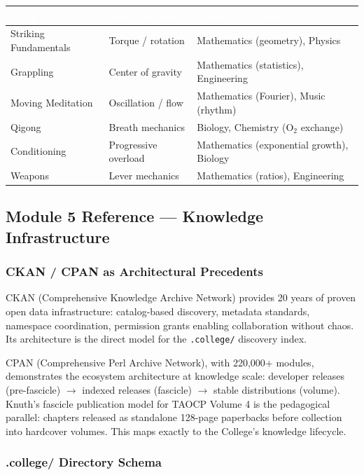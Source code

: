 \documentclass[11pt,letterpaper]{article}
\newcommand{\tableheader}[1]{\textbf{\sffamily\textcolor{white}{#1}}}
\begin{document}
\begin{center}
\begin{tabularx}{\textwidth}{L{3.5cm}L{3cm}X}
\toprule
{}
\tableheader{Wing} & \tableheader{Seed Concept} & \tableheader{Cross-Dept Links} \\
\midrule
Striking Fundamentals & Torque / rotation & Mathematics (geometry), Physics \\
Grappling & Center of gravity & Mathematics (statistics), Engineering \\
Moving Meditation & Oscillation / flow & Mathematics (Fourier), Music (rhythm) \\
Qigong & Breath mechanics & Biology, Chemistry (O$_2$ exchange) \\
Conditioning & Progressive overload & Mathematics (exponential growth), Biology \\
Weapons & Lever mechanics & Mathematics (ratios), Engineering \\
\bottomrule
\end{tabularx}
\end{center}

\subsection{Module 5 Reference --- Knowledge Infrastructure}

\subsubsection{CKAN / CPAN as Architectural Precedents}

CKAN (Comprehensive Knowledge Archive Network) provides 20 years of proven open data infrastructure: catalog-based discovery, metadata standards, namespace coordination, permission grants enabling collaboration without chaos. Its architecture is the direct model for the \texttt{.college/} discovery index.

CPAN (Comprehensive Perl Archive Network), with 220,000+ modules, demonstrates the ecosystem architecture at knowledge scale: developer releases (pre-fascicle) $\rightarrow$ indexed releases (fascicle) $\rightarrow$ stable distributions (volume). Knuth's fascicle publication model for TAOCP Volume 4 is the pedagogical parallel: chapters released as standalone 128-page paperbacks before collection into hardcover volumes. This maps exactly to the College's knowledge lifecycle.

\subsubsection{.college/ Directory Schema}
\end{document}
